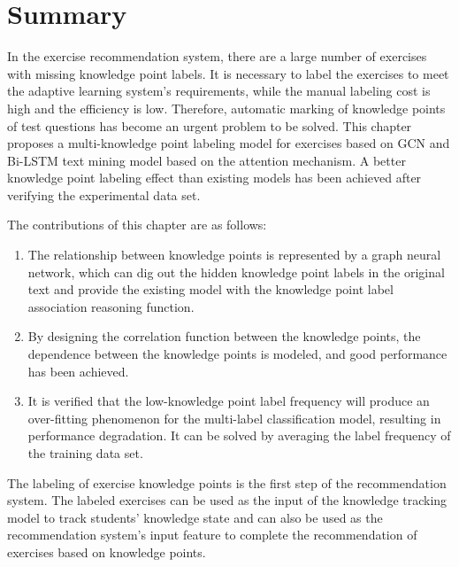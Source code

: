 \section{Summary}



In the exercise recommendation system, there are a large number of exercises with missing knowledge point labels. It is necessary to label the exercises to meet the adaptive learning system's requirements, while the manual labeling cost is high and the efficiency is low. Therefore, automatic marking of knowledge points of test questions has become an urgent problem to be solved. This chapter proposes a multi-knowledge point labeling model for exercises based on GCN and Bi-LSTM text mining model based on the attention mechanism. A better knowledge point labeling effect than existing models has been achieved after verifying the experimental data set.

The contributions of this chapter are as follows:
\begin{enumerate}
    \item The relationship between knowledge points is represented by a graph neural network, which can dig out the hidden knowledge point labels in the original text and provide the existing model with the knowledge point label association reasoning function.
    \item By designing the correlation function between the knowledge points, the dependence between the knowledge points is modeled, and good performance has been achieved.
    \item It is verified that the low-knowledge point label frequency will produce an over-fitting phenomenon for the multi-label classification model, resulting in performance degradation. It can be solved by averaging the label frequency of the training data set.
\end{enumerate}

The labeling of exercise knowledge points is the first step of the recommendation system. The labeled exercises can be used as the input of the knowledge tracking model to track students' knowledge state and can also be used as the recommendation system's input feature to complete the recommendation of exercises based on knowledge points.

